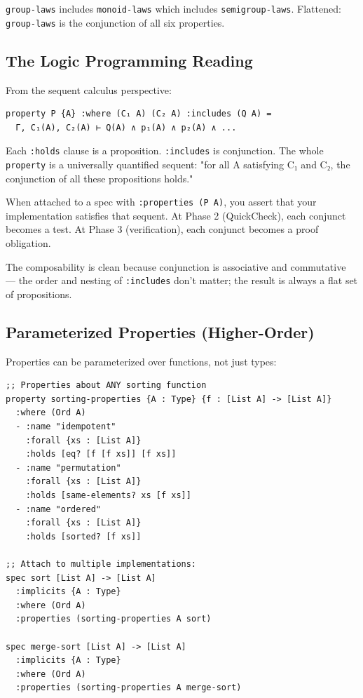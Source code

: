 \documentclass[11pt]{article}
\begin{document}
\texttt{group-laws} includes \texttt{monoid-laws} which includes \texttt{semigroup-laws}. Flattened:
\texttt{group-laws} is the conjunction of all six properties.
\subsection{The Logic Programming Reading}
\label{sec:org3c61716}

From the sequent calculus perspective:

\begin{verbatim}
property P {A} :where (C₁ A) (C₂ A) :includes (Q A) =
  Γ, C₁(A), C₂(A) ⊢ Q(A) ∧ p₁(A) ∧ p₂(A) ∧ ...
\end{verbatim}

Each \texttt{:holds} clause is a proposition. \texttt{:includes} is conjunction. The whole
\texttt{property} is a universally quantified sequent: "for all A satisfying C₁ and C₂,
the conjunction of all these propositions holds."

When attached to a spec with \texttt{:properties (P A)}, you assert that your
implementation satisfies that sequent. At Phase 2 (QuickCheck), each conjunct
becomes a test. At Phase 3 (verification), each conjunct becomes a proof
obligation.

The composability is clean because conjunction is associative and commutative ---
the order and nesting of \texttt{:includes} don't matter; the result is always a flat
set of propositions.
\subsection{Parameterized Properties (Higher-Order)}
\label{sec:org04619f5}

Properties can be parameterized over functions, not just types:

\begin{verbatim}
;; Properties about ANY sorting function
property sorting-properties {A : Type} {f : [List A] -> [List A]}
  :where (Ord A)
  - :name "idempotent"
    :forall {xs : [List A]}
    :holds [eq? [f [f xs]] [f xs]]
  - :name "permutation"
    :forall {xs : [List A]}
    :holds [same-elements? xs [f xs]]
  - :name "ordered"
    :forall {xs : [List A]}
    :holds [sorted? [f xs]]

;; Attach to multiple implementations:
spec sort [List A] -> [List A]
  :implicits {A : Type}
  :where (Ord A)
  :properties (sorting-properties A sort)

spec merge-sort [List A] -> [List A]
  :implicits {A : Type}
  :where (Ord A)
  :properties (sorting-properties A merge-sort)
\end{verbatim}
\end{document}

